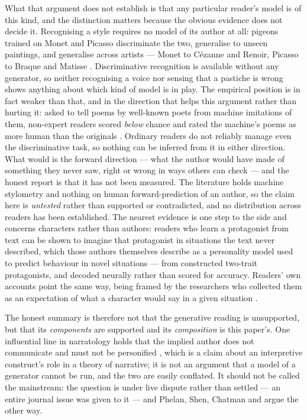 \documentclass[11pt,a4paper]{article}
\theoremstyle{remark}\newtheorem{remark}[definition]{Remark}
\begin{document}
What that argument does not establish is that any particular reader's model is of this kind, and
the distinction matters because the obvious evidence does not decide it. Recognising a style
requires no model of its author at all: pigeons trained on Monet and Picasso discriminate the two,
generalise to unseen paintings, and generalise across artists --- Monet to C\'ezanne and Renoir,
Picasso to Braque and Matisse \citep{watanabe1995}. Discriminative recognition is available without
any generator, so neither recognising a voice nor sensing that a pastiche is wrong shows anything
about which kind of model is in play. The empirical position is in fact weaker than that, and in the
direction that helps this argument rather than hurting it: asked to tell poems by well-known poets
from machine imitations of them, non-expert readers scored \emph{below} chance and rated the machine's
poems as more human than the originals \citep{porter2024}. Ordinary readers do not reliably manage
even the discriminative task, so nothing can be inferred from it in either direction. What would is the forward direction --- what the author
would have made of something they never saw, right or wrong in ways others can check --- and the
honest report is that it has not been measured. The literature holds machine stylometry and
nothing on human forward-prediction of an author, so the claim here is \emph{untested} rather than
supported or contradicted, and no distribution across readers has been established. The nearest evidence is one step to the side and concerns
characters rather than authors: readers who learn a protagonist from text can be shown to imagine that
protagonist in situations the text never described, which those authors themselves describe as a
personality model used to predict behaviour in novel situations \citep{hassabis2014} --- from
constructed two-trait protagonists, and decoded neurally rather than scored for accuracy. Readers' own
accounts point the same way, being framed by the researchers who collected them as an expectation of
what a character would say in a given situation \citep{aldersonday2017}.

The honest summary is therefore not that the generative reading is unsupported, but that its
\emph{components} are supported and its \emph{composition} is this paper's. One influential
line in narratology holds that the implied author does not communicate and must not be personified
\citep{genette1988,kindt2006}, which is a claim about an interpretive construct's role
in a theory of narrative; it is not an argument that a model of a generator cannot be run, and the two
are easily conflated. It should not be called the mainstream: the question is under live dispute rather than settled --- an entire journal issue was given to
it \citep{style2011} --- and Phelan, Shen, Chatman and \citet{rabinowitz2011} argue the other way.
\end{document}
